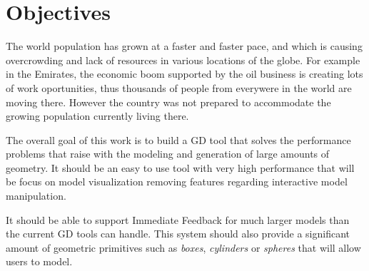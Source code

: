 
% 
% 

\section{Objectives}
\label{sec:objectives}

The world population has grown at a faster and faster pace, and  which is causing overcrowding and lack of resources in various locations of the globe. For example in the Emirates, the economic boom supported by the oil business is creating lots of work oportunities, thus thousands of people from everywere in the world are moving there. However the country was not prepared to accommodate the growing population currently living there. 


The overall goal of this work is to build a GD tool that solves the performance problems that raise with the modeling and generation of large amounts of geometry. It should be an easy to use tool with very high performance that will be focus on model visualization removing features regarding interactive model manipulation.

It should be able to support Immediate Feedback for much larger models than the current GD tools can handle. This system should also provide a significant amount of geometric primitives such as \emph{boxes}, \emph{cylinders} or \emph{spheres} that will allow users to model.

